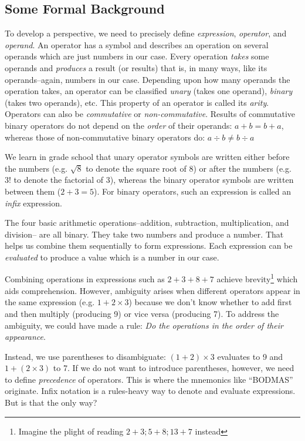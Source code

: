 \documentclass{resonance}
\begin{document}
\subsection{Some Formal Background}
To develop a perspective, we need to precisely define \emph{expression}, \emph{operator}, and \emph{operand}. An operator has a symbol and describes an operation on several operands which are just numbers in our case. Every operation \emph{takes} some operands and \emph{produces} a result (or results) that is, in many ways, like its operands--again, numbers in our case. Depending upon how many operands the operation takes, an operator can be classified \emph{unary} (takes one operand), \emph{binary} (takes two operands), etc. This property of an operator is called its \emph{arity}. Operators can also be \emph{commutative} or \emph{non-commutative}. Results of commutative binary operators do not depend on the \emph{order} of their operands: $a+b=b+a$, whereas those of non-commutative binary operators do: $a\div b \ne b\div a$ 

We learn in grade school that unary operator symbols are written either before the numbers (e.g. $\sqrt 8$ to denote the square root of 8) or after the numbers (e.g. $3!$ to denote the factorial of 3), whereas the binary operator symbols are written between them ($2 + 3 = 5$). For binary operators, such an expression is called an \emph{infix} expression.

The four basic arithmetic operations--addition, subtraction, multiplication, and division-- are all binary. They take two numbers and produce a number. That helps us combine them sequentially to form expressions. Each expression can be \emph{evaluated} to produce a value which is a number in our case.

Combining operations in expressions such as $2+3+8+7$ achieve brevity\footnote{Imagine the plight of reading $2+3; 5+8; 13+7$ instead} which aids comprehension. However, ambiguity arises when different operators appear in the same expression (e.g. $1+2\times 3$) because we don't know whether to add first and then multiply (producing 9) or vice versa (producing 7). To address the ambiguity, we could have made a rule: \emph{Do the operations in the order of their appearance}.

Instead, we use parentheses to disambiguate: $(1+2)\times 3$ evaluates to 9 and $1+(2\times 3)$ to 7. If we do not want to introduce parentheses, however, we need to define \emph{precedence} of operators. This is where the mnemonics like ``BODMAS'' originate.  Infix notation is a rules-heavy way to denote and evaluate expressions. But is that the only way?
\end{document}
